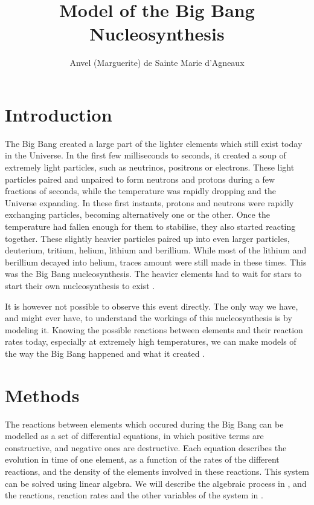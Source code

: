 \documentclass[a4paper, 12pt]{article}
\title{Model of the Big Bang Nucleosynthesis}
\author{Anvel (Marguerite) de Sainte Marie d'Agneaux}
\date{}
\begin{document}
\maketitle

\section{Introduction}
\label{sec:intro}
The Big Bang created a large part of the lighter elements which still exist today in the Universe. In the first few milliseconds to seconds, it created a soup of extremely light particles, such as neutrinos, positrons or electrons. These light particles paired and unpaired to form neutrons and protons during a few fractions of seconds, while the temperature was rapidly dropping and the Universe expanding. In these first instants, protons and neutrons were rapidly exchanging particles, becoming alternatively one or the other. Once the temperature had fallen enough for them to stabilise, they also started reacting together. These slightly heavier particles paired up into even larger particles, deuterium, tritium, helium, lithium and berillium. While most of the lithium and berillium decayed into helium, traces amount were still made in these times. This was the Big Bang nucleosynthesis. The heavier elements had to wait for stars to start their own nucleosynthesis to exist \parencite{copi_big-bang_1995}.

It is however not possible to observe this event directly. The only way we have, and might ever have, to understand the workings of this nucleosynthesis is by modeling it. Knowing the possible reactions between elements and their reaction rates today, especially at extremely high temperatures, we can make models of the way the Big Bang happened and what it created \parencite{copi_big-bang_1995}. 

\section{Methods}
\label{sec:met}
The reactions between elements which occured during the Big Bang can be modelled as a set of differential equations, in which positive terms are constructive, and negative ones are destructive. Each equation describes the evolution in time of one element, as a function of the rates of the different reactions, and the density of the elements involved in these reactions. This system can be solved using linear algebra. We will describe the algebraic process in , and the reactions, reaction rates and the other variables of the system in .
\end{document}
